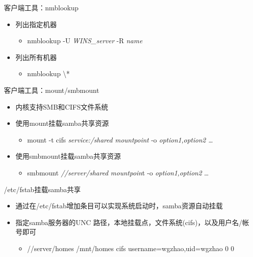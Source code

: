 \begin{frame}{客户端工具：nmblookup}
\begin{itemize}
\item 列出指定机器

\begin{itemize}
\item nmblookup -U \emph{WINS\_server} -R \emph{name}
\end{itemize}
\item 列出所有机器

\begin{itemize}
\item nmblookup \textbackslash{}{*}
\end{itemize}
\end{itemize}

\end{frame} 
\begin{frame}{客户端工具：mount/smbmount}
\begin{itemize}
\item 内核支持SMB和CIFS文件系统
\item 使用mount挂载samba共享资源

\begin{itemize}
\item mount -t cifs \emph{service:/shared mountpoint} -o \emph{option1,option2
\ldots{}}
\end{itemize}
\item 使用smbmount挂载samba共享资源

\begin{itemize}
\item smbmount \emph{//server/shared mountpoin}t -o \emph{option1,option2}
\ldots{}
\end{itemize}
\end{itemize}

\end{frame} 
\begin{frame}{/etc/fstab挂载samba共享}
\begin{itemize}
\item 通过在/etc/fstab增加条目可以实现系统启动时，samba资源自动挂载
\item 指定samba服务器的UNC 路径，本地挂载点，文件系统(cifs)，以及用户名/帐号即可

\begin{itemize}
\item //server/homes /mnt/homes cifs username=wgzhao,uid=wgzhao 0 0
\end{itemize}
\end{itemize}

\end{frame} 
